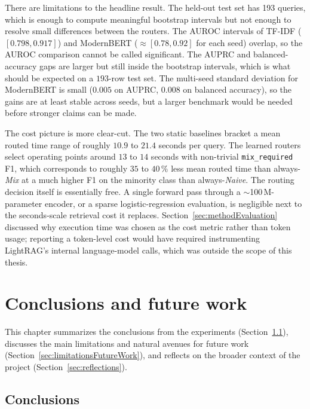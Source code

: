 \documentclass[english, bibtex]{kththesis}               %
\numberwithin{listing}{chapter}
\begin{document}
There are limitations to the headline result. The held-out test set has 193 queries, which is enough to compute meaningful bootstrap intervals but not enough to resolve small differences between the routers. The AUROC intervals of TF-IDF ($[0.798, 0.917]$) and ModernBERT ($\approx [0.78, 0.92]$ for each seed) overlap, so the AUROC comparison cannot be called significant. The AUPRC and balanced-accuracy gaps are larger but still inside the bootstrap intervals, which is what should be expected on a $193$-row test set. The multi-seed standard deviation for ModernBERT is small ($0.005$ on AUPRC, $0.008$ on balanced accuracy), so the gains are at least stable across seeds, but a larger benchmark would be needed before stronger claims can be made.

The cost picture is more clear-cut. The two static baselines bracket a mean routed time range of roughly $10.9$ to $21.4$ seconds per query. The learned routers select operating points around $13$ to $14$ seconds with non-trivial \texttt{mix\_required} F1, which corresponds to roughly $35$ to $40\,\%$ less mean routed time than always-\emph{Mix} at a much higher F1 on the minority class than always-\emph{Naive}. The routing decision itself is essentially free. A single forward pass through a $\sim$100\,M-parameter encoder, or a sparse logistic-regression evaluation, is negligible next to the seconds-scale retrieval cost it replaces. Section~\ref{sec:methodEvaluation} discussed why execution time was chosen as the cost metric rather than token usage; reporting a token-level cost would have required instrumenting LightRAG's internal language-model calls, which was outside the scope of this thesis.

\cleardoublepage
\chapter{Conclusions and future work}
\label{ch:conclusionsAndFutureWork}

This chapter summarizes the conclusions from the experiments (Section~\ref{sec:conclusions}), discusses the main limitations and natural avenues for future work (Section~\ref{sec:limitationsFutureWork}), and reflects on the broader context of the project (Section~\ref{sec:reflections}).

\section{Conclusions}
\label{sec:conclusions}
\end{document}
